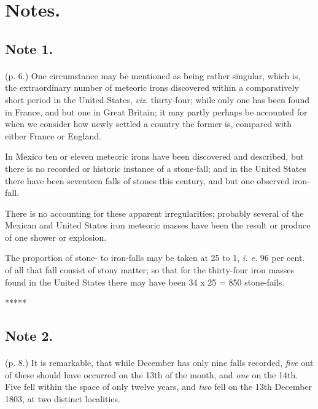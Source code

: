 \documentclass[a4paper, 12pt, oneside]{article}
\begin{document}
\section{Notes.}
\subsection{Note 1.}
\paragraph{}
(p. 6.) One circumstance may be mentioned as being rather singular, which is, the extraordinary number of meteoric irons discovered within a comparatively short period in the United States, \emph{viz.} thirty-four; while only one has been found in France, and but one in Great Britain; it may partly perhaps be accounted for when we consider how newly settled a country the former is, compared with either France or England.

In Mexico ten or eleven meteoric irons have been discovered and described, but there is no recorded or historic instance of a stone-fall; and in the United States there have been seventeen falls of stones this century, and but one observed iron-fall.

There is no accounting for these apparent irregularities; probably several of the Mexican and United States iron meteoric masses have been the result or produce of one shower or explosion.

The proportion of stone- to iron-falls may be taken at 25 to 1, \emph{i. e.} 96 per cent. of all that fall consist of stony matter; so that for the thirty-four iron masses found in the United States there may have been 34 x 25 = 850 stone-fails.

\centerline{*\hspace{15mm}*\hspace{15mm}*\hspace{15mm}*\hspace{15mm}*}
\bigskip

\subsection{Note 2.}
\paragraph{}
(p. 8.) It is remarkable, that while December has only nine falls recorded, \emph{five} out of these should have occurred on the 13th of the month, and \emph{one} on the 14th. Five fell within the space of only twelve years, and \emph{two} fell on the 13th December 1803, at two distinct localities.
\end{document}
